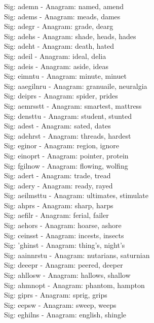 Sig: {ademn} - Anagram: named, amend \\
Sig: {adems} - Anagram: meads, dames \\
Sig: {adegr} - Anagram: grade, dearg \\
Sig: {adehs} - Anagram: shade, heads, hades \\
Sig: {adeht} - Anagram: death, hated \\
Sig: {adeil} - Anagram: ideal, delia \\
Sig: {adeis} - Anagram: aside, ideas \\
Sig: {eimntu} - Anagram: minute, minuet \\
Sig: {aaegilnru} - Anagram: granuaile, neuralgia \\
Sig: {deiprs} - Anagram: spider, prides \\
Sig: {aemrsstt} - Anagram: smartest, mattress \\
Sig: {densttu} - Anagram: student, stunted \\
Sig: {adest} - Anagram: sated, dates \\
Sig: {adehrst} - Anagram: threads, hardest \\
Sig: {eginor} - Anagram: region, ignore \\
Sig: {einoprt} - Anagram: pointer, protein \\
Sig: {fgilnow} - Anagram: flowing, wolfing \\
Sig: {adert} - Anagram: trade, tread \\
Sig: {adery} - Anagram: ready, rayed \\
Sig: {aeilmsttu} - Anagram: ultimates, stimulate \\
Sig: {ahprs} - Anagram: sharp, harps \\
Sig: {aefilr} - Anagram: ferial, failer \\
Sig: {aehors} - Anagram: hoarse, ashore \\
Sig: {ceinsst} - Anagram: incests, insects \\
Sig: {'ghinst} - Anagram: thing's, night's \\
Sig: {aainnrstu} - Anagram: nutarians, saturnian \\
Sig: {deeepr} - Anagram: peered, deeper \\
Sig: {ahllosw} - Anagram: hallows, shallow \\
Sig: {ahmnopt} - Anagram: phantom, hampton \\
Sig: {giprs} - Anagram: sprig, grips \\
Sig: {eepsw} - Anagram: sweep, weeps \\
Sig: {eghilns} - Anagram: english, shingle \\

